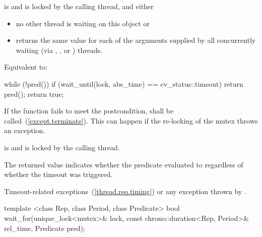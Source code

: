 \begin{itemdescr}
\pnum
\requires {} is  and  is
locked by the calling thread, and either

\begin{itemize}
\item no other thread is waiting on this  object or
\item {} returns the same value for each of the 
arguments supplied by all concurrently waiting (via ,
, or ) threads.
\end{itemize}

\pnum
\effects Equivalent to:
\begin{codeblock}
while (!pred())
  if (wait_until(lock, abs_time) == cv_status::timeout)
    return pred();
return true;
\end{codeblock}

\pnum
\notes
If the function fails to meet the postcondition, 
shall be called~(\ref{except.terminate}).
\enternote This can happen if the re-locking of the mutex throws an exception. \exitnote

\pnum
\postcondition {} is  and 
is locked by the calling thread.

\pnum
\enternote The returned value indicates whether the predicate evaluated to
 regardless of whether the timeout was triggered. \exitnote

\pnum
\throws Timeout-related
exceptions~(\ref{thread.req.timing}) or any exception thrown by .

\end{itemdescr}

%
%
\begin{itemdecl}
template <class Rep, class Period, class Predicate>
  bool wait_for(unique_lock<mutex>& lock,
                const chrono::duration<Rep, Period>& rel_time,
                Predicate pred);
\end{itemdecl}

